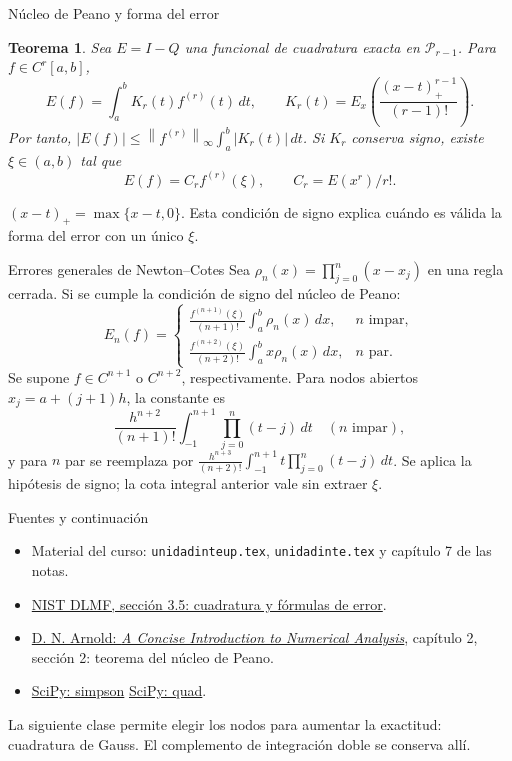 \documentclass[aspectratio=169,12pt]{beamer}
\newcommand{\norm}[1]{\left\lVert#1\right\rVert}
\newcommand{\PiN}{\mathcal P}
\newtheorem{thm}{Teorema}
\begin{document}
\begin{frame}{Núcleo de Peano y forma del error}
\small
\begin{thm}
Sea $E=I-Q$ una funcional de cuadratura exacta en $\PiN_{r-1}$.
Para $f\in C^r[a,b]$,
\[E(f)=\int_a^b K_r(t)f^{(r)}(t)\,dt,\qquad
K_r(t)=E_x\left(\frac{(x-t)_+^{r-1}}{(r-1)!}\right).\]
Por tanto, $|E(f)|\leq\norm{f^{(r)}}_\infty\int_a^b|K_r(t)|\,dt$.
Si $K_r$ conserva signo, existe $\xi\in(a,b)$ tal que
\[E(f)=C_r f^{(r)}(\xi),\qquad C_r=E(x^r)/r!.\]
\end{thm}
$(x-t)_+=\max\{x-t,0\}$. Esta condición de signo explica cuándo es válida
la forma del error con un único $\xi$.
\end{frame}

\begin{frame}{Errores generales de Newton--Cotes}
\small
Sea $\rho_n(x)=\prod_{j=0}^n(x-x_j)$ en una regla cerrada.
Si se cumple la condición de signo del núcleo de Peano:
\[
E_n(f)=\begin{cases}
\displaystyle\frac{f^{(n+1)}(\xi)}{(n+1)!}\int_a^b\rho_n(x)\,dx,&n\text{ impar},\\[2mm]
\displaystyle\frac{f^{(n+2)}(\xi)}{(n+2)!}\int_a^b x\rho_n(x)\,dx,&n\text{ par}.
\end{cases}\]
Se supone $f\in C^{n+1}$ o $C^{n+2}$, respectivamente.
Para nodos abiertos $x_j=a+(j+1)h$, la constante es
\[\frac{h^{n+2}}{(n+1)!}\int_{-1}^{n+1}\prod_{j=0}^n(t-j)\,dt\quad(n\text{ impar}),\]
y para $n$ par se reemplaza por
$\frac{h^{n+3}}{(n+2)!}\int_{-1}^{n+1}t\prod_{j=0}^n(t-j)\,dt$.
Se aplica la hipótesis de signo; la cota integral anterior vale sin extraer $\xi$.
\end{frame}

\begin{frame}{Fuentes y continuación}
\small
\begin{itemize}
\item Material del curso: \texttt{unidadinteup.tex}, \texttt{unidadinte.tex} y capítulo 7 de las notas.
\item \href{https://dlmf.nist.gov/3.5}{NIST DLMF, sección 3.5: cuadratura y fórmulas de error}.
\item \href{https://www-users.cse.umn.edu/~arnold/597.00-01/nabook.pdf}{D. N. Arnold: \emph{A Concise Introduction to Numerical Analysis}},
capítulo 2, sección 2: teorema del núcleo de Peano.
\item \href{https://docs.scipy.org/doc/scipy/reference/generated/scipy.integrate.simpson.html}{SciPy: simpson}
\quad\href{https://docs.scipy.org/doc/scipy/reference/generated/scipy.integrate.quad.html}{SciPy: quad}.
\end{itemize}
La siguiente clase permite elegir los nodos para aumentar la exactitud:
cuadratura de Gauss. El complemento de integración doble se conserva allí.
\end{frame}
\end{document}

